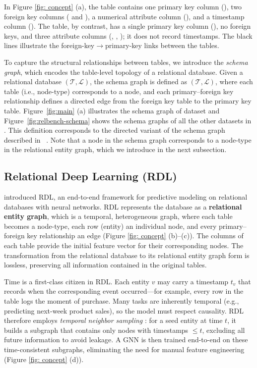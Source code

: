 \documentclass{article}
\theoremstyle{plain}
\theoremstyle{definition}
\theoremstyle{remark}
\begin{document}
In Figure \ref{fig: concept} (a), the  table contains one primary key column (), two foreign key columns ( and ), a numerical attribute column (), and a timestamp column (). The  table, by contrast, has a single primary key column (), no foreign keys, and three attribute columns (, , ); it does not record timestamps. The black lines illustrate the foreign-key$\rightarrow$primary-key links between the tables.

To capture the structural relationships between tables, we introduce the \emph{schema graph}, which encodes the table-level topology of a relational database. Given a relational database $(\mathcal{T}, \mathcal{L})$, the schema graph is defined as $(\mathcal{T}, \mathcal{L})$, where each table (i.e., node-type) corresponds to a node, and each primary–foreign key relationship defines a directed edge from the foreign key table to the primary key table. Figure~\ref{fig:main} (a) illustrates the schema graph of \fone dataset and Figure~\ref{fig:relbench-schema} shows the schema graphs of all the other datasets in \relbench. This definition corresponds to the directed variant of the schema graph described in ~\citet{fey2023relational}. Note that a node in the schema graph corresponds to a node-type in the relational entity graph, which we introduce in the next subsection.


\subsection{Relational Deep Learning (RDL)}
\label{sec:rdl}
\citet{fey2023relational} introduced RDL, an end-to-end framework for predictive modeling on relational databases with neural networks. RDL represents the database as a \textbf{relational entity graph}, which is a temporal, heterogeneous graph, where each table becomes a node-type, each row (entity) an individual node, and every primary–foreign key relationship an edge (Figure \ref{fig: concept} (b)–(c)). The columns of each table provide the initial feature vector for their corresponding nodes. The transformation from the relational database to its relational entity graph form is lossless, preserving all information contained in the original tables.

Time is a first-class citizen in RDL. Each entity $v$ may carry a timestamp $t_v$ that records when the corresponding event occurred—for example, every row in the  table logs the moment of purchase. Many tasks are inherently temporal (e.g., predicting next-week product sales), so the model must respect causality. RDL therefore employs \emph{temporal neighbor sampling} \citep{hamilton2017inductive,fey2023relational}: for a seed entity at time $t$, it builds a subgraph that contains only nodes with timestamps $\le t$, excluding all future information to avoid leakage. A GNN is then trained end-to-end on these time-consistent subgraphs, eliminating the need for manual feature engineering (Figure \ref{fig: concept} (d)).
\end{document}
